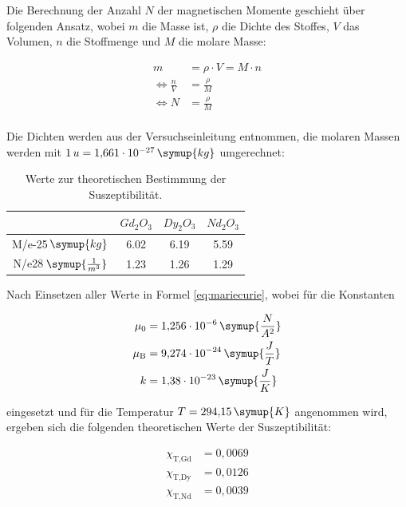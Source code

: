 Die Berechnung der Anzahl $N$ der magnetischen Momente geschieht über folgenden Ansatz, wobei $m$ die Masse ist, $\rho$ die Dichte des Stoffes, $V$ das Volumen, $n$ die Stoffmenge und $M$ die molare Masse:

\begin{equation}
\begin{aligned}
m &= \rho \cdot V = M \cdot n\\
\iff \frac{n}{V} &= \frac{\rho}{M} \\
\iff N &= \frac{\rho}{M} \\
\end{aligned}
\end{equation}

Die Dichten werden aus der Versuchseinleitung \cite[14]{anleitung606} entnommen, die molaren Massen \cite{molaremasse} werden mit $1\,u = 1{,}661\cdot10^{-27}\,\symup{kg}$ umgerechnet:

\begin{table}[htbp]
\centering
\caption{Werte zur theoretischen Bestimmung der Suszeptibilität.}
\label{tab:some_data}
\begin{tabular}{S[table-figures-exponent=2] S[table-auto-round, table-format=1.2] S S}
\toprule
 & {$Gd_2O_3 $} & {$Dy_2O_3$} & {$Nd_2O_3$} \\
\midrule
M/e-25\,$\symup{kg}$& 6.02 & 6.19 & 5.59 \\
N/e28\,$\symup{\frac{1}{m^3}}$ & 1.23   & 1.26  & 1.29  \\
\bottomrule
\end{tabular}
\end{table}

Nach Einsetzen aller Werte in Formel \ref{eq:mariecurie}, wobei für die Konstanten

\begin{equation*}
\begin{aligned}
\mu_0          &= 1{,}256\cdot10^{-6}\,\symup{\frac{N}{A^2}} \\
\mu_{\text{B}} &= 9{,}274\cdot10^{-24}\,\symup{\frac{J}{T}} \\
k              &= 1{,}38 \cdot10^{-23}\,\symup{\frac{J}{K}} \\
\end{aligned}
\end{equation*}

eingesetzt und für die Temperatur $T=294{,}15\,\symup{K}$ angenommen wird, ergeben sich die folgenden theoretischen Werte der Suszeptibilität:

\begin{equation}
\begin{aligned}
\chi_{\text{T,Gd}} &= 0{,}0069 \\
\chi_{\text{T,Dy}} &= 0{,}0126 \\
\chi_{\text{T,Nd}} &= 0{,}0039 \\
\end{aligned}
\end{equation}






